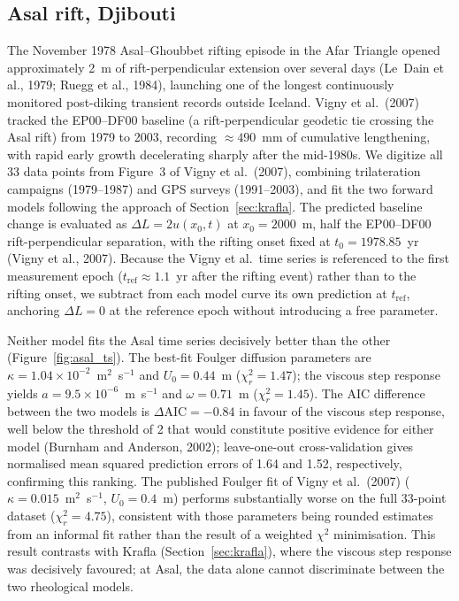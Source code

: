 \documentclass[12pt]{article}
\begin{document}
\subsection{Asal rift, Djibouti}
\label{sec:asal}

The November 1978 Asal--Ghoubbet rifting episode in the Afar Triangle opened
approximately 2~m of rift-perpendicular extension over several days (Le~Dain
et al., 1979; Ruegg et al., 1984), launching one of the longest continuously
monitored post-diking transient records outside Iceland.  Vigny et al.\ (2007)
tracked the EP00--DF00 baseline (a rift-perpendicular geodetic tie crossing
the Asal rift) from 1979 to 2003, recording $\approx490$~mm of cumulative
lengthening, with rapid early growth decelerating sharply after the mid-1980s.
We digitize all 33 data points from Figure~3 of Vigny et al.\ (2007), combining
trilateration campaigns (1979--1987) and GPS surveys (1991--2003), and fit the
two forward models following the approach of Section~\ref{sec:krafla}.  The
predicted baseline change is evaluated as $\Delta L = 2u(x_0,t)$ at
$x_0 = 2000$~m, half the EP00--DF00 rift-perpendicular separation, with the
rifting onset fixed at $t_0 = 1978.85$~yr (Vigny et al., 2007).  Because the
Vigny et al.\ time series is referenced to the first measurement epoch
($t_{\mathrm{ref}} \approx 1.1$~yr after the rifting event) rather than to the
rifting onset, we subtract from each model curve its own prediction at
$t_{\mathrm{ref}}$, anchoring $\Delta L = 0$ at the reference epoch without
introducing a free parameter.

Neither model fits the Asal time series decisively better than the other
(Figure~\ref{fig:asal_ts}).  The best-fit Foulger diffusion parameters are
$\kappa = 1.04\times10^{-2}$~m$^2$~s$^{-1}$ and $U_0 = 0.44$~m
($\chi^2_r = 1.47$); the viscous step response yields
$a = 9.5\times10^{-6}$~m~s$^{-1}$ and $\omega = 0.71$~m ($\chi^2_r = 1.45$).
The AIC difference between the two models is $\Delta\mathrm{AIC} = -0.84$ in
favour of the viscous step response, well below the threshold of 2 that would
constitute positive evidence for either model (Burnham and Anderson, 2002);
leave-one-out cross-validation gives normalised mean squared prediction errors
of 1.64 and 1.52, respectively, confirming this ranking.  The published Foulger
fit of Vigny et al.\ (2007) ($\kappa = 0.015$~m$^2$~s$^{-1}$, $U_0 = 0.4$~m)
performs substantially worse on the full 33-point dataset ($\chi^2_r = 4.75$),
consistent with those parameters being rounded estimates from an informal fit
rather than the result of a weighted $\chi^2$ minimisation.  This result contrasts with Krafla
(Section~\ref{sec:krafla}), where the viscous step response was decisively
favoured; at Asal, the data alone cannot discriminate between the two rheological
models.
\end{document}

